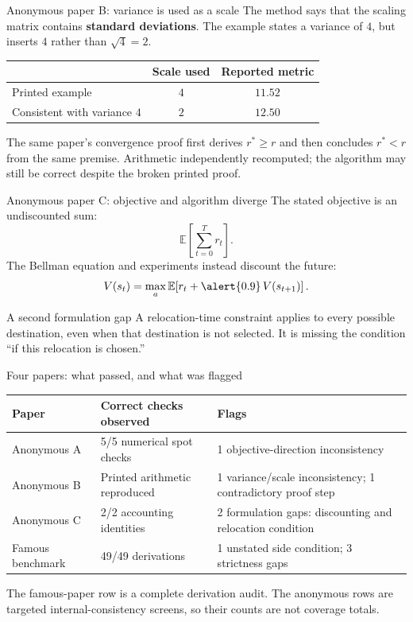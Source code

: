 \documentclass[aspectratio=169,11pt]{beamer}
\begin{document}
\begin{frame}{Anonymous paper B: variance is used as a scale}
  The method says that the scaling matrix contains \textbf{standard deviations}. The example states a variance of $4$, but inserts $4$ rather than $\sqrt{4}=2$.
  \vfill
  \begin{center}
  \begin{tabular}{@{}lcc@{}}
    \toprule
     & \textbf{Scale used} & \textbf{Reported metric} \\
    \midrule
    Printed example & $4$ & $11.52$ \\
    Consistent with variance $4$ & $2$ & $12.50$ \\
    \bottomrule
  \end{tabular}
  \end{center}
  \vfill
  The same paper's convergence proof first derives $r^*\ge r$ and then concludes $r^*<r$ from the same premise.
  \vfill
  {\color{slate}\small Arithmetic independently recomputed; the algorithm may still be correct despite the broken printed proof.}
\end{frame}

\begin{frame}{Anonymous paper C: objective and algorithm diverge}
  The stated objective is an undiscounted sum:
  \[
    \mathbb{E}\!\left[\sum_{t=0}^{T} r_t\right].
  \]
  The Bellman equation and experiments instead discount the future:
  \[
    V(s_t)=\max_a\mathbb{E}\!\left[r_t+\alert{0.9}\,V(s_{t+1})\right].
  \]
  \vfill
  \begin{block}{A second formulation gap}
    A relocation-time constraint applies to every possible destination, even when that destination is not selected. It is missing the condition ``if this relocation is chosen.''
  \end{block}
\end{frame}

\begin{frame}{Four papers: what passed, and what was flagged}
  \begin{center}
  \small
  \begin{tabular}{@{}p{}p{}p{}@{}}
    \toprule
    \textbf{Paper} & \textbf{Correct checks observed} & \textbf{Flags} \\
    \midrule
    Anonymous A & 5/5 numerical spot checks & 1 objective-direction inconsistency \\[0.45em]
    Anonymous B & Printed arithmetic reproduced & 1 variance/scale inconsistency; 1 contradictory proof step \\[0.45em]
    Anonymous C & 2/2 accounting identities & 2 formulation gaps: discounting and relocation condition \\[0.45em]
    Famous benchmark & 49/49 derivations & 1 unstated side condition; 3 strictness gaps \\
    \bottomrule
  \end{tabular}
  \end{center}
  \vfill
  {\color{slate}\scriptsize The famous-paper row is a complete derivation audit. The anonymous rows are targeted internal-consistency screens, so their counts are not coverage totals.}
\end{frame}
\end{document}
